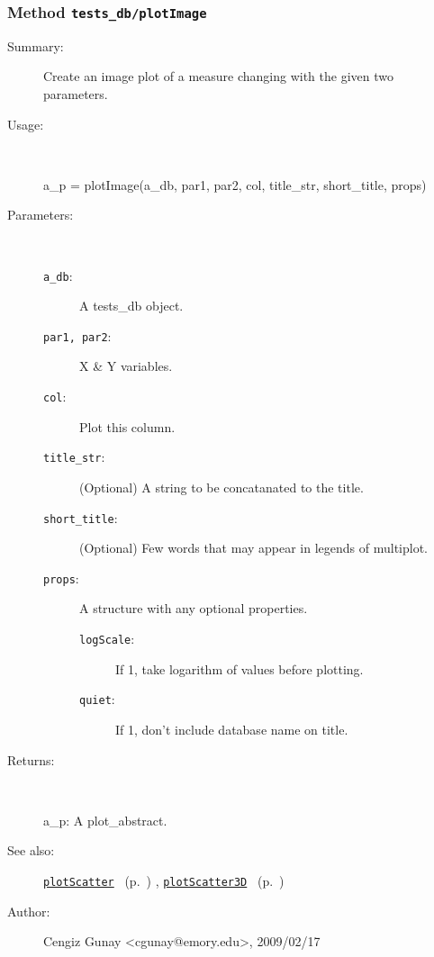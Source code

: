 \subsubsection[Method \texttt{plotImage}]{Method \texttt{tests\_db/plotImage}}%
%
\label{ref_tests_db__plotImage}%
\hypertarget{ref_tests_db__plotImage}{}%
\begin{description}
\item[Summary:]Create an image plot of a measure changing with the given two parameters.
%
\item[Usage:]~%
\begin{lyxcode}%
a\_p = plotImage(a\_db, par1, par2, col, title\_str, short\_title, props)
%
\end{lyxcode}%
%
%
\item[Parameters:]~
\begin{description}%
\item[\texttt{a\_db}:]
 A tests\_db object.
\item[\texttt{par1, par2}:]
 X \& Y variables.
\item[\texttt{col}:]
 Plot this column.
\item[\texttt{title\_str}:]
 (Optional) A string to be concatanated to the title.
\item[\texttt{short\_title}:]
 (Optional) Few words that may appear in legends of multiplot.
\item[\texttt{props}:]
 A structure with any optional properties.
\begin{description}%
\item[\texttt{logScale}:]
 If 1, take logarithm of values before plotting.
\item[\texttt{quiet}:]
 If 1, don't include database name on title.
\end{description}%
\end{description}%
%
\item[Returns:
]~

	a\_p: A plot\_abstract.
%
%
\item[See also:]%
\hyperlink{ref_plotScatter}{\texttt{plotScatter}}%
\ (p.~\pageref{ref_plotScatter})%
%
, \hyperlink{ref_plotScatter3D}{\texttt{plotScatter3D}}%
\ (p.~\pageref{ref_plotScatter3D})%
%
%
\item[Author:]%
Cengiz Gunay <cgunay@emory.edu>, 2009/02/17
%
\end{description}
\methodline%
